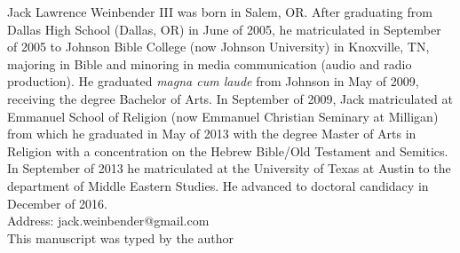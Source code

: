 
Jack Lawrence Weinbender III was born in Salem, OR. After graduating from Dallas High School (Dallas, OR) in June of 2005, he matriculated in September of 2005 to Johnson Bible College (now Johnson University) in Knoxville, TN, majoring in Bible and minoring in media communication (audio and radio production). He graduated \emph{magna cum laude} from Johnson in May of 2009, receiving the degree Bachelor of Arts. In September of 2009, Jack matriculated at Emmanuel School of Religion (now Emmanuel Christian Seminary at Milligan) from which he graduated in May of 2013 with the degree Master of Arts in Religion with a concentration on the Hebrew Bible/Old Testament and Semitics. In September of 2013 he matriculated at the University of Texas at Austin to the department of Middle Eastern Studies. He advanced to doctoral candidacy in December of 2016.\\[36pt]


\noindent
Address: jack.weinbender@gmail.com\\[24pt]

\noindent
This manuscript was typed by the author
